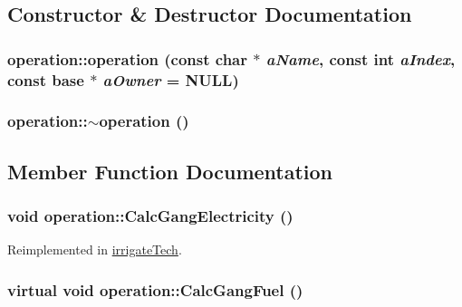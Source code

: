 \subsection{Constructor \& Destructor Documentation}
\hypertarget{classoperation_abc9c1aa7fb9f6b9afed39b2ca05db3ca}{
\subsubsection[{operation}]{\setlength{\rightskip}{0pt plus 5cm}operation::operation (const char $\ast$ {\em aName}, \/  const int {\em aIndex}, \/  const {\bf base} $\ast$ {\em aOwner} = {\ttfamily NULL})}}
\label{classoperation_abc9c1aa7fb9f6b9afed39b2ca05db3ca}
\hypertarget{classoperation_ae41fe8b80fc92676e15e3ea25f09bea7}{
\subsubsection[{$\sim$operation}]{\setlength{\rightskip}{0pt plus 5cm}operation::$\sim$operation ()}}
\label{classoperation_ae41fe8b80fc92676e15e3ea25f09bea7}


\subsection{Member Function Documentation}
\hypertarget{classoperation_a056348509e5e2da6c1cc03360a587df8}{
\subsubsection[{CalcGangElectricity}]{\setlength{\rightskip}{0pt plus 5cm}void operation::CalcGangElectricity ()}}
\label{classoperation_a056348509e5e2da6c1cc03360a587df8}


Reimplemented in \hyperlink{classirrigate_tech_aff9f1aa84dc7255d893012191ac232f4}{irrigateTech}.\hypertarget{classoperation_ab311cc421c3cc2a37dee5f2fc4e4c296}{
\subsubsection[{CalcGangFuel}]{\setlength{\rightskip}{0pt plus 5cm}virtual void operation::CalcGangFuel ()}}
\label{classoperation_ab311cc421c3cc2a37dee5f2fc4e4c296}


